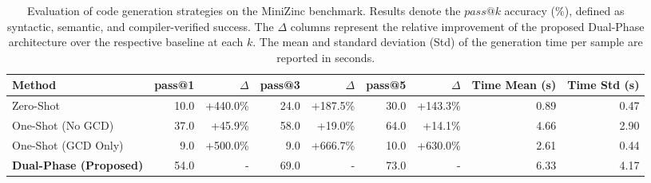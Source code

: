 \begin{table}[htbp]
  \centering
  \caption{Evaluation of code generation strategies on the MiniZinc benchmark. Results denote the $pass@k$ accuracy (\%), defined as syntactic, semantic, and compiler-verified success. The $\Delta$ columns represent the relative improvement of the proposed Dual-Phase architecture over the respective baseline at each $k$. The mean and standard deviation (Std) of the generation time per sample are reported in seconds.}
  \label{tab:pass_at_k}
  \begin{tabular}{l r r r r r r r r}
    \toprule
    \textbf{Method} & \textbf{pass@1} & \textbf{$\Delta$} & \textbf{pass@3} & \textbf{$\Delta$} & \textbf{pass@5} & \textbf{$\Delta$} & \textbf{Time Mean (s)} & \textbf{Time Std (s)} \\
    \midrule
    Zero-Shot & 10.0 & +440.0\% & 24.0 & +187.5\% & 30.0 & +143.3\% & 0.89 & 0.47 \\
    One-Shot (No GCD) & 37.0 & +45.9\% & 58.0 & +19.0\% & 64.0 & +14.1\% & 4.66 & 2.90 \\
    One-Shot (GCD Only) & 9.0 & +500.0\% & 9.0 & +666.7\% & 10.0 & +630.0\% & 2.61 & 0.44 \\
    \textbf{Dual-Phase (Proposed)} & 54.0 & - & 69.0 & - & 73.0 & - & 6.33 & 4.17 \\
    \bottomrule
  \end{tabular}
\end{table}